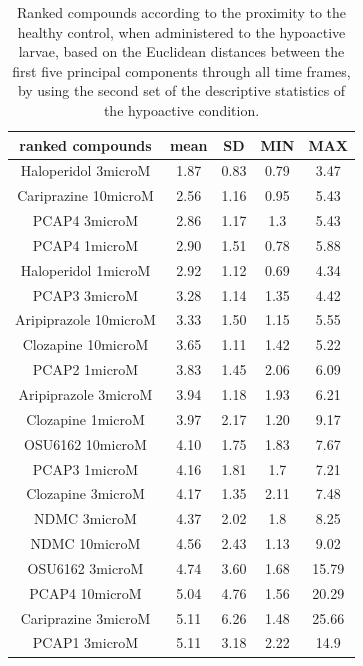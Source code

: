 \documentclass[a4paper,12pt]{article}
\begin{document}
\begin{table}[h!]\tiny
\centering
\caption{Ranked compounds according to the proximity to the healthy control, when administered to the hypoactive larvae, based on the Euclidean distances between the first five principal components through all time frames, by using the second set of the descriptive statistics of the hypoactive condition.}
\begin{tabular}{|c|c|c|c|c|}
\hline
ranked compounds             & mean & SD   & MIN  & MAX   \\ \hline
Haloperidol 3microM   & 1.87  & 0.83  & 0.79 & 3.47  \\ \hline
Cariprazine 10microM  & 2.56  & 1.16  & 0.95 & 5.43  \\ \hline
PCAP4 3microM       & 2.86  & 1.17  & 1.3  & 5.43  \\ \hline
PCAP4 1microM       & 2.90   & 1.51  & 0.78 & 5.88  \\ \hline
Haloperidol 1microM   & 2.92  & 1.12  & 0.69 & 4.34  \\ \hline
PCAP3 3microM       & 3.28  & 1.14  & 1.35 & 4.42  \\ \hline
Aripiprazole 10microM & 3.33  & 1.50   & 1.15 & 5.55  \\ \hline
Clozapine 10microM    & 3.65  & 1.11  & 1.42 & 5.22  \\ \hline
PCAP2 1microM         & 3.83  & 1.45  & 2.06 & 6.09  \\ \hline
Aripiprazole 3microM  & 3.94  & 1.18  & 1.93 & 6.21  \\ \hline
Clozapine 1microM     & 3.97  & 2.17  & 1.20  & 9.17  \\ \hline
OSU6162 10microM      & 4.10   & 1.75  & 1.83 & 7.67  \\ \hline
PCAP3 1microM       & 4.16  & 1.81  & 1.7  & 7.21  \\ \hline
Clozapine 3microM     & 4.17  & 1.35  & 2.11 & 7.48  \\ \hline
NDMC 3microM          & 4.37  & 2.02  & 1.8  & 8.25  \\ \hline
NDMC 10microM         & 4.56  & 2.43  & 1.13 & 9.02  \\ \hline
OSU6162 3microM       & 4.74  & 3.60   & 1.68 & 15.79 \\ \hline
PCAP4 10microM      & 5.04  & 4.76  & 1.56 & 20.29 \\ \hline
Cariprazine 3microM   & 5.11  & 6.26  & 1.48 & 25.66 \\ \hline
PCAP1 3microM         & 5.11  & 3.18  & 2.22 & 14.9  \\ \hline

\end{tabular}
\end{table}
\end{document}
